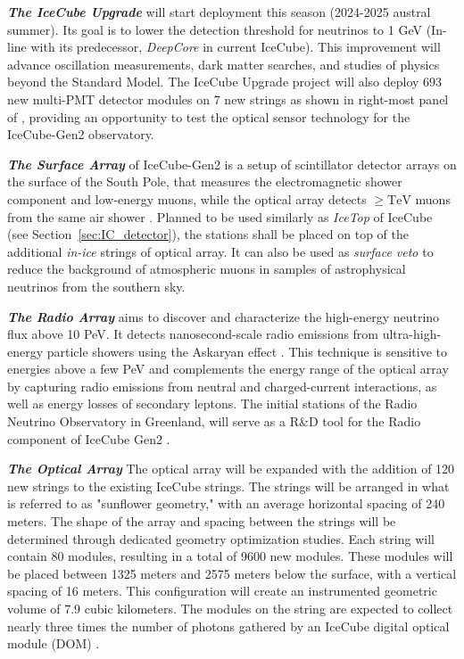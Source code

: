 \begin{description}
    \item \textbf{\emph{The IceCube Upgrade}} will start deployment this season (2024-2025 austral summer). Its goal is to lower the detection threshold for neutrinos to 1 GeV (In-line with its predecessor, \emph{DeepCore} in current IceCube). This improvement will advance oscillation measurements, dark matter searches, and studies of physics beyond the Standard Model. The IceCube Upgrade project will also deploy 693 new multi-PMT detector modules on 7 new strings as shown in right-most panel of , providing an opportunity to test the optical sensor technology for the IceCube-Gen2 observatory.

    \item \textbf{\emph{The Surface Array}} of IceCube-Gen2 is a setup of scintillator detector arrays on the surface of the South Pole, that measures the electromagnetic shower component and low-energy muons, while the optical array detects $\geq \mathrm{TeV}$ muons from the same air shower . Planned to be used similarly as \emph{IceTop} of IceCube (see Section~\ref{sec:IC_detector}), the stations shall be placed on top of the additional \emph{in-ice} strings of optical array. It can also be used as \emph{surface veto} to reduce the background of atmospheric muons in samples of astrophysical neutrinos from the southern sky.

    \item \textbf{\emph{The Radio Array}} aims to discover and characterize the high-energy neutrino flux above 10 PeV. It detects nanosecond-scale radio emissions from ultra-high-energy particle showers using the Askaryan effect . This technique is sensitive to energies above a few PeV and complements the energy range of the optical array by capturing radio emissions from neutral and charged-current interactions, as well as energy losses of secondary leptons. The initial stations of the Radio Neutrino Observatory in Greenland, will serve as a R\&D tool for the Radio component of IceCube Gen2 .

    \item \textbf{\emph{The Optical Array}} The optical array will be expanded with the addition of 120 new strings to the existing IceCube strings. The strings will be arranged in what is referred to as "sunflower geometry," with an average horizontal spacing of 240 meters. The shape of the array and spacing between the strings will be determined through dedicated geometry optimization studies. Each string will contain 80 modules, resulting in a total of 9600 new modules. These modules will be placed between 1325 meters and 2575 meters below the surface, with a vertical spacing of 16 meters. This configuration will create an instrumented geometric volume of 7.9 cubic kilometers. The modules on the string are expected to collect nearly three times the number of photons gathered by an IceCube digital optical module (DOM) .
\end{description}

